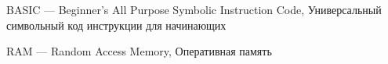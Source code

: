 
\hypertarget{basic}{BASIC --- Beginner's All Purpose Symbolic Instruction Code, Универсальный символьный код инструкции для начинающих}

\hypertarget{ram}{RAM --- Random Access Memory, Оперативная память}

\clearpage